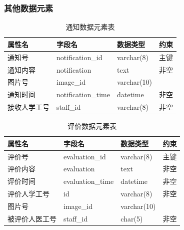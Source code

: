 \documentclass{article}
\begin{document}
\subsubsection{其他数据元素}

\begin{table}[H]
    \centering
    \begin{tabularx}{\textwidth}{|>{\raggedright\arraybackslash}X|>{\raggedright\arraybackslash}X|>{\raggedright\arraybackslash}X|>{\raggedright\arraybackslash}X|}
    \toprule
    \textbf{属性名} & \textbf{字段名} & \textbf{数据类型} & \textbf{约束} \\ \midrule
    通知号 & notification\_id & varchar(8) & 主键 \\ \midrule
    通知内容 & notification & text & 非空 \\ \midrule
    图片号 & image\_id & varchar(10) &  \\ \midrule
    通知时间 & notification\_time & datetime & 非空 \\ \midrule
    接收人学工号 & staff\_id & varchar(8) & 非空 \\ \bottomrule
    \end{tabularx}
    \caption{通知数据元素表}
    \label{tab:notification_elements}   
\end{table}

\begin{table}[H]
    \centering
    \begin{tabularx}{\textwidth}{|>{\raggedright\arraybackslash}X|>{\raggedright\arraybackslash}X|>{\raggedright\arraybackslash}X|>{\raggedright\arraybackslash}X|}
    \toprule
    \textbf{属性名} & \textbf{字段名} & \textbf{数据类型} & \textbf{约束} \\ \midrule
    评价号 & evaluation\_id & varchar(8) & 主键 \\ \midrule
    评价内容 & evaluation & text & 非空 \\ \midrule
    评价时间 & evaluation\_time & datetime & 非空 \\ \midrule
    评价人学工号 & id & varchar(8) & 非空 \\ \midrule
    图片号 & image\_id & varchar(10) &  \\ \midrule
    被评价人医工号 & staff\_id & char(5) & 非空 \\ \bottomrule
    \end{tabularx}
    \caption{评价数据元素表}
    \label{tab:evaluation_elements}
\end{table}
\end{document}
